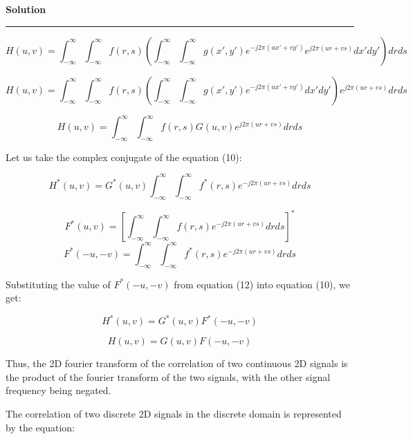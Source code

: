 \documentclass[a4paper]{article}
\newenvironment{solution}[2][]{%
    \begin{mdframed}[linecolor=green!60!black, linewidth=2pt, roundcorner=10pt, backgroundcolor=green!5!white, skipabove=12pt, skipbelow=12pt]%
        \textbf{\large #2} %
        \par\noindent\rule{\textwidth}{0.4pt} %
        \vspace{0.5em} %
}{%
    \end{mdframed}%
}
\begin{document}
\begin{solution}{Solution}
\begin{equation}
    H(u, v) = \int_{-\infty}^{\infty} \int_{-\infty}^{\infty} f(r, s) \left( \int_{-\infty}^{\infty} \int_{-\infty}^{\infty} g(x', y') e^{-j2\pi(ux'+vy')} e^{j2\pi(ur+vs)} dx' dy' \right) dr ds
\end{equation}

\begin{equation}
    H(u, v) = \int_{-\infty}^{\infty} \int_{-\infty}^{\infty} f(r, s) \left( \int_{-\infty}^{\infty} \int_{-\infty}^{\infty} g(x', y') e^{-j2\pi(ux'+vy')} dx' dy' \right) e^{j2\pi(ur+vs)} dr ds
\end{equation}

\begin{equation}
    H(u, v) = \int_{-\infty}^{\infty} \int_{-\infty}^{\infty} f(r, s) G(u,v) e^{j2\pi(ur+vs)} dr ds
\end{equation}


Let us take the complex conjugate of the equation (10):

\begin{equation}
    H^*(u, v) = G^*(u,v) \int_{-\infty}^{\infty} \int_{-\infty}^{\infty} f^*(r, s)  e^{-j2\pi(ur+vs)} dr ds
\end{equation}

\begin{equation}
    F^*(u, v) = [\int_{-\infty}^{\infty} \int_{-\infty}^{\infty} f(r, s)  e^{-j2\pi(ur+vs)} dr ds]^*
\end{equation}
\begin{equation}
    F^*(-u, -v) = \int_{-\infty}^{\infty} \int_{-\infty}^{\infty} f^*(r, s)  e^{-j2\pi(ur+vs)} dr ds
\end{equation}

Substituting the value of $F^*(-u, -v)$ from equation (12) into equation (10), we get:

\begin{equation}
    H^*(u, v) = G^*(u,v) F^*(-u, -v)
\end{equation}

\begin{equation}
    H(u, v) = G(u,v) F(-u, -v)
\end{equation}

Thus, the 2D fourier transform of the correlation of two continuous 2D signals is the product of the fourier transform of the two signals, with the other signal frequency being negated.


The correlation of two discrete 2D signals in the discrete domain is represented by the equation:


\end{solution}
\end{document}
